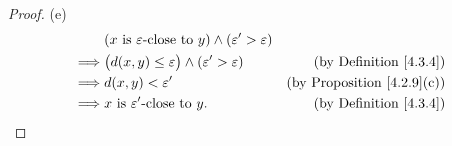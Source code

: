 \begin{proof}{(e)}
    \begin{align*}
                 & (x \text{ is \(\varepsilon\)-close to } y) \land (\varepsilon' > \varepsilon)                                          \\
        \implies & \big(d(x, y) \leq \varepsilon\big) \land (\varepsilon' > \varepsilon)         & \text{(by Definition \ref{4.3.4})}     \\
        \implies & d(x, y) < \varepsilon'                                                        & \text{(by Proposition \ref{4.2.9}(c))} \\
        \implies & x \text{ is \(\varepsilon'\)-close to } y.                                    & \text{(by Definition \ref{4.3.4})}
    \end{align*}
\end{proof}

